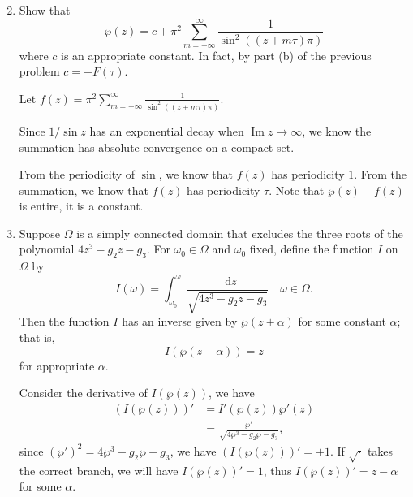 \documentclass[11pt]{report}
\theoremstyle{mythm}
\let\oldendproof\endproof
\renewenvironment{proof}[1][\proofname]{%
  \oldproof[\normalfont \bfseries #1]%
}{\oldendproof}
\renewcommand*{\proofname}{Proof}
\theoremstyle{myans}
\newcommand{\dd}{\mathop{}\!\mathrm{d}}
\renewcommand{\Im}{\operatorname{Im}}
\begin{document}
\begin{enumerate}
  \setcounter{enumi}{1}
  \item Show that
  \[ \wp(z) = c + \pi^2 \sum_{m=-\infty}^{\infty} \frac 1{\sin^2((z + m\tau) \pi)} \]
  where $c$ is an appropriate constant. In fact, by part (b) of the previous problem $c = -F(\tau)$.
  \begin{proof}
    Let $f(z) = \pi^2 \sum_{m=-\infty}^{\infty} \frac 1{\sin^2((z + m\tau) \pi)}$.

    Since $1/\sin z$ has an exponential decay when $\Im z\to \infty$, we know the summation has
    absolute convergence on a compact set.

    From the periodicity of $\sin$, we know that $f(z)$ has periodicity $1$. From the summation,
    we know that $f(z)$ has periodicity $\tau$. Note that $\wp(z) - f(z)$ is entire,
    it is a constant.
  \end{proof}
  \item Suppose $\Omega$ is a simply connected domain that excludes the three roots of the
  polynomial $4z^3 - g_2 z - g_3$. For $\omega_0 \in \Omega$ and $\omega_0$ fixed, define the function
  $I$ on $\Omega$ by
  \[ I(\omega) = \int_{\omega_0}^\omega \frac{\dd z}{\sqrt{4z^3 - g_2 z - g_3}} \quad \omega \in \Omega. \]
  Then the function $I$ has an inverse given by $\wp(z + \alpha)$ for some constant $\alpha$; that is,
  \[ I(\wp(z+\alpha)) = z \]
  for appropriate $\alpha$.
  \begin{proof}
    Consider the derivative of $I(\wp(z))$, we have
    \begin{align*}
      (I(\wp(z)))' &= I'(\wp(z)) \wp'(z)\\
      &= \frac{\wp'}{\sqrt{4 \wp^3 - g_2\wp - g_3}},
    \end{align*}
    since $(\wp')^2 = 4\wp^3 - g_2\wp - g_3$, we have $(I(\wp(z)))' = \pm 1$.
    If $\sqrt{\cdot}$ takes the correct branch, we will have $I(\wp(z))' = 1$, thus
    $I(\wp(z))' = z - \alpha$ for some $\alpha$.
  \end{proof}
\end{enumerate}
\end{document}
